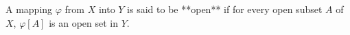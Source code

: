 A mapping $\varphi$ from $X$ into $Y$ is said to be **open** if for every open subset $A$ of $X$, $\varphi[A]$ is an open set in $Y$.
